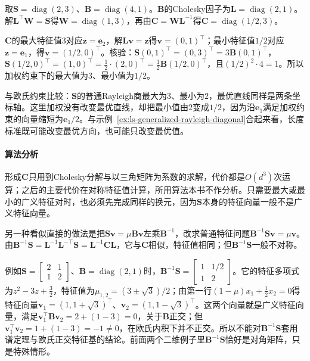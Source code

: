 \begin{example}[按三角求解的步骤计算]
\label{ex:matrix-approximation-generalized-cholesky}
取$\bm S=\operatorname{diag}(2,3)$、$\bm B=\operatorname{diag}(4,1)$。$\bm B$的Cholesky因子为$\bm L=\operatorname{diag}(2,1)$。解$\bm L^\top\bm W=\bm S$得$\bm W=\operatorname{diag}(1,3)$，再由$\bm C=\bm W\bm L^{-1}$得$\bm C=\operatorname{diag}(1/2,3)$。

$\bm C$的最大特征值$3$对应$\bm z=\bm e_2$，解$\bm L\bm v=\bm z$得$\bm v=(0,1)^\top$；最小特征值$1/2$对应$\bm z=\bm e_1$，得$\bm v=(1/2,0)^\top$。核验：$\bm S(0,1)^\top=(0,3)^\top=3\bm B(0,1)^\top$，$\bm S(1/2,0)^\top=(1,0)^\top=\frac12\cdot(2,0)^\top=\frac12\bm B(1/2,0)^\top$，且$(1/2)^2\cdot4=1$。所以加权约束下的最大值为$3$、最小值为$1/2$。

与欧氏约束比较：$\bm S$的普通Rayleigh商最大为$3$、最小为$2$，最优直线同样是两条坐标轴。这里加权没有改变最优直线，却把最小值由$2$变成$1/2$，因为沿$\bm e_1$满足加权约束的向量缩短为$\bm e_1/2$。与示例~\ref{ex:ls-generalized-rayleigh-diagonal}合起来看，长度标准既可能改变最优方向，也可能只改变最优值。
\end{example}

\paragraph{算法分析}

形成$\bm C$只用到Cholesky分解与以三角矩阵为系数的求解，代价都是$O(d^3)$次运算；之后的主要代价在对称特征值计算，所用算法本书不作分析。只需要最大或最小的广义特征对时，也必须先完成同样的换元，因为$\bm S$本身的特征向量一般不是广义特征向量。

另一种看似直接的做法是把$\bm S\bm v=\mu\bm B\bm v$左乘$\bm B^{-1}$，改求普通特征问题$\bm B^{-1}\bm S\bm v=\mu\bm v$。由$\bm B^{-1}\bm S=\bm L^{-1}\bm L^{-\top}\bm S=\bm L^{-1}\bm C\bm L$，它与$\bm C$相似，特征值相同；但$\bm B^{-1}\bm S$一般不对称。

例如$\bm S=\left[\begin{smallmatrix}2&1\\1&2\end{smallmatrix}\right]$、$\bm B=\operatorname{diag}(2,1)$时，$\bm B^{-1}\bm S=\left[\begin{smallmatrix}1&1/2\\1&2\end{smallmatrix}\right]$。它的特征多项式为$z^2-3z+\tfrac32$，特征值为$\mu_{1,2}=(3\pm\sqrt3)/2$；由第一行$(1-\mu)x_1+\tfrac12x_2=0$得特征向量$\bm v_1=(1,1+\sqrt3)^\top$、$\bm v_2=(1,1-\sqrt3)^\top$。这两个向量就是广义特征向量，满足$\bm v_1^\top\bm B\bm v_2=2+(1-3)=0$，关于$\bm B$正交；但$\bm v_1^\top\bm v_2=1+(1-3)=-1\neq0$，在欧氏内积下并不正交。所以不能对$\bm B^{-1}\bm S$套用谱定理与欧氏正交特征基的结论。前面两个二维例子里$\bm B^{-1}\bm S$恰好是对角矩阵，只是特殊情形。

